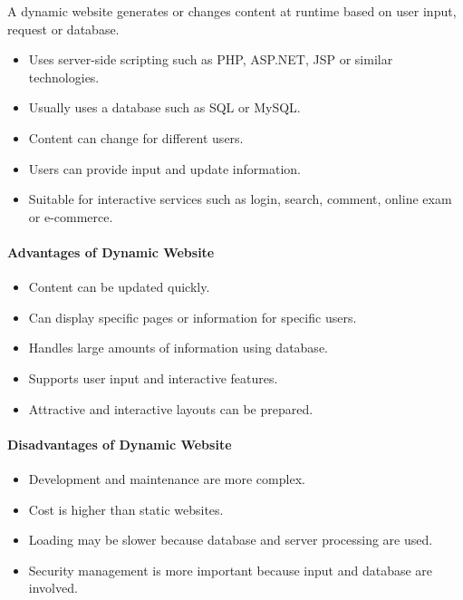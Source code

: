 \begin{definitionbox}
A dynamic website generates or changes content at runtime based on user input, request or database.
\end{definitionbox}

\begin{itemize}
    \item Uses server-side scripting such as PHP, ASP.NET, JSP or similar technologies.
    \item Usually uses a database such as SQL or MySQL.
    \item Content can change for different users.
    \item Users can provide input and update information.
    \item Suitable for interactive services such as login, search, comment, online exam or e-commerce.
\end{itemize}

\paragraph{Advantages of Dynamic Website}

\begin{itemize}
    \item Content can be updated quickly.
    \item Can display specific pages or information for specific users.
    \item Handles large amounts of information using database.
    \item Supports user input and interactive features.
    \item Attractive and interactive layouts can be prepared.
\end{itemize}

\paragraph{Disadvantages of Dynamic Website}

\begin{itemize}
    \item Development and maintenance are more complex.
    \item Cost is higher than static websites.
    \item Loading may be slower because database and server processing are used.
    \item Security management is more important because input and database are involved.
\end{itemize}


